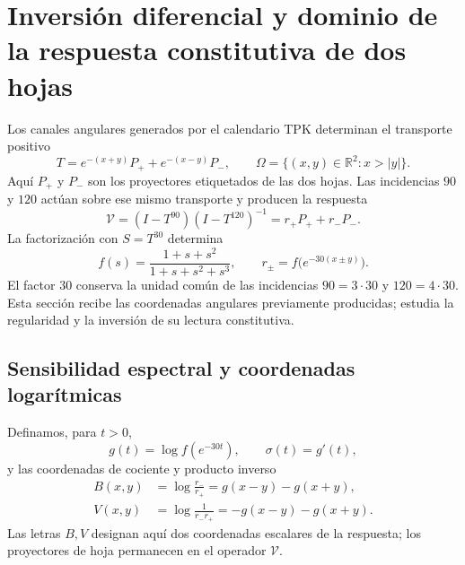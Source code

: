 
\section[Inversión diferencial de la respuesta constitutiva]{Inversión diferencial y dominio de la respuesta constitutiva de dos hojas}
\label{jc:sec:constitutiva}

Los canales angulares generados por el calendario TPK determinan el
transporte positivo
\[
T=e^{-(x+y)}P_++e^{-(x-y)}P_-,\qquad
\Omega=\{(x,y)\in\mathbb R^2:x>|y|\}.
\]
Aquí $P_+$ y $P_-$ son los proyectores etiquetados de las dos hojas.
Las incidencias $90$ y $120$ actúan sobre ese mismo transporte y
producen la respuesta
\[
\mathcal V=(I-T^{90})(I-T^{120})^{-1}=r_+P_++r_-P_-.
\]
La factorización con $S=T^{30}$ determina
\begin{equation}
f(s)=\frac{1+s+s^2}{1+s+s^2+s^3},\qquad
r_\pm=f\bigl(e^{-30(x\pm y)}\bigr).
\label{jc:eq:respuesta}
\end{equation}
El factor $30$ conserva la unidad común de las incidencias
$90=3\cdot30$ y $120=4\cdot30$. Esta sección recibe las coordenadas
angulares previamente producidas; estudia la regularidad y la inversión
de su lectura constitutiva.

\subsection{Sensibilidad espectral y coordenadas logarítmicas}

Definamos, para $t>0$,
\[
g(t)=\log f(e^{-30t}),\qquad \sigma(t)=g'(t),
\]
y las coordenadas de cociente y producto inverso
\begin{align}
B(x,y)&=\log\frac{r_-}{r_+}=g(x-y)-g(x+y),\\
V(x,y)&=\log\frac1{r_-r_+}=-g(x-y)-g(x+y).
\label{jc:eq:bv}
\end{align}
Las letras $B,V$ designan aquí dos coordenadas escalares de la respuesta;
los proyectores de hoja permanecen en el operador $\mathcal V$.


